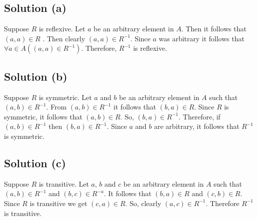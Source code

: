 \documentclass{article}
\begin{document}
\subsection{Solution (a)}
Suppose $R$ is reflexive. Let $a$ be an arbitrary element in $A$. Then
it follows that $(a,a) \in R$ . Then clearly $(a,a) \in R^{-1}$. Since
$a$ was arbitrary it follows that $\forall a \in A((a,a) \in R^{-1})$.
Therefore, $R^{-1}$ is reflexive.

\subsection{Solution (b)}
Suppose $R$ is symmetric. Let $a$ and $b$ be an arbitrary element in
$A$ such that $(a,b) \in R^{-1}$. From $(a,b) \in R^{-1}$ it follows
that $(b,a) \in R$. Since $R$ is symmetric, it follows that $(a,b) \in
R$. So, $(b,a) \in R^{-1}$. Therefore, if $(a,b) \in R^{-1}$ then
$(b,a) \in R^{-1}$. Since $a$ and $b$ are arbitrary, it follows that
$R^{-1}$ is symmetric.

\subsection{Solution (c)}
Suppose $R$ is transitive. Let $a$, $b$ and $c$ be an arbitrary
element in $A$ such that $(a,b) \in R^{-1}$ and $(b,c) \in R^{-a}$. It
follows that $(b,a) \in R$ and $(c,b) \in R$. Since $R$ is transitive
we get $(c,a) \in R$. So, clearly $(a,c) \in R^{-1}$. Therefore
$R^{-1}$ is transitive.
\end{document}
